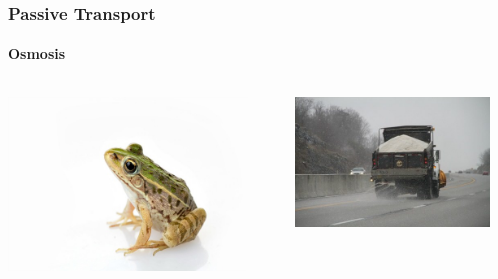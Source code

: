 \documentclass[10pt]{beamer}
\begin{document}
\begin{frame}[t]
\frametitle{Passive Transport}
\framesubtitle{Osmosis}
\vspace{0.5cm}

	\begin{columns}
		\begin{column}{0.5\textwidth}
			\begin{center}
				\includegraphics[width=0.9\textwidth]{figures/frog.jpg}
			\end{center}
		\end{column}
		
		\begin{column}{0.5\textwidth}
			\begin{center}
				\includegraphics[width=0.9\textwidth]{figures/saltingroad.jpg}
			\end{center}
		\end{column}
	\end{columns}	
\end{frame}
\end{document}
